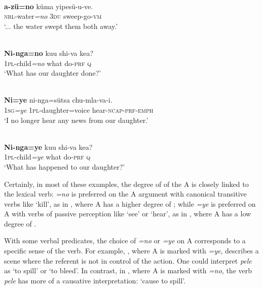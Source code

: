 \documentclass[output=paper]{LSP/langsci}
\begin{document}
\ea\label{13-te-ex:10}
\\
 \textbf{a-zü=no} küma yipesü-u-ve.\\
{ } \textsc{nrl}-water\textit{=no}\textsc{} \textsc{3du\-} sweep-go-\textsc{vm}\\
\glt ‘... the water swept them both away.’ %
\z

\ea\label{13-te-ex:11}
\\
\gll  \textbf{Ni-nga=no} kuu shi-va kea?\\
1\textsc{pl}-child\textit{=no} what do-\textsc{prf} \textsc{q}\\
\glt ‘What has our daughter done?’ %
\z

\ea\label{13-te-ex:12}
\\
\gll  \textbf{Ni=ye} ni-nga=sütsa chu-mla-va-i.\\
1\textsc{sg}\textit{=ye} 1\textsc{pl}-daughter=voice hear-\textsc{ncap-prf-emph}\\
\glt ‘I no longer hear any news from our daughter.’ %
\z

\ea\label{13-te-ex:13}
\\
\gll  \textbf{Ni-nga=ye} kuu shi-va kea?\\
1\textsc{pl}-child\textit{=ye} what do-\textsc{prf} \textsc{q}\\
\glt ‘What has happened to our daughter?’ %
\z

Certainly, in most of these examples, the degree of  of the A is closely linked to the lexical verb: \textit{=no} is preferred on the A argument with canonical transitive verbs like ‘kill’, as in , where A has a higher degree of ; while \textit{=ye} is preferred on A with verbs of passive perception like ‘see’ or ‘hear’, as in , where A has a low degree of .

With some verbal predicates, the choice of \textit{=no} or \textit{=ye} on A corresponds to a specific sense of the verb. For example, , where A is marked with \textit{=ye}, describes a scene where the referent is not in control of the action. One could interpret \textit{pele} as ‘to spill’ or ‘to bleed’. In contrast, in , where A is marked with \textit{=no}, the verb \textit{pele} has more of a causative interpretation: ‘cause to spill’.
\end{document}
